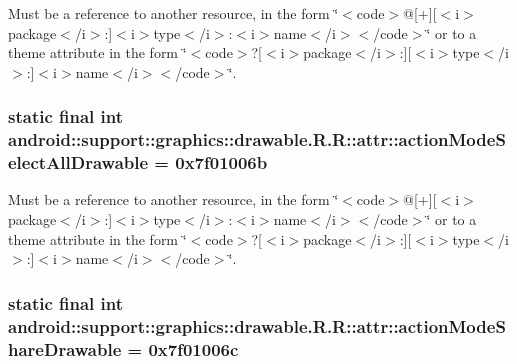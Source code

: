 Must be a reference to another resource, in the form \char`\"{}$<$code$>$@\mbox{[}+\mbox{]}\mbox{[}$<$i$>$package$<$/i$>$:\mbox{]}$<$i$>$type$<$/i$>$:$<$i$>$name$<$/i$>$$<$/code$>$\char`\"{} or to a theme attribute in the form \char`\"{}$<$code$>$?\mbox{[}$<$i$>$package$<$/i$>$:\mbox{]}\mbox{[}$<$i$>$type$<$/i$>$:\mbox{]}$<$i$>$name$<$/i$>$$<$/code$>$\char`\"{}. \hypertarget{classandroid_1_1support_1_1graphics_1_1drawable_1_1_r_1_1attr_dd174a3dc818113c34b5471f650763ff}{
\subsubsection[{actionModeSelectAllDrawable}]{\setlength{\rightskip}{0pt plus 5cm}static final int android::support::graphics::drawable.R.R::attr::actionModeSelectAllDrawable = 0x7f01006b}}
\label{classandroid_1_1support_1_1graphics_1_1drawable_1_1_r_1_1attr_dd174a3dc818113c34b5471f650763ff}


Must be a reference to another resource, in the form \char`\"{}$<$code$>$@\mbox{[}+\mbox{]}\mbox{[}$<$i$>$package$<$/i$>$:\mbox{]}$<$i$>$type$<$/i$>$:$<$i$>$name$<$/i$>$$<$/code$>$\char`\"{} or to a theme attribute in the form \char`\"{}$<$code$>$?\mbox{[}$<$i$>$package$<$/i$>$:\mbox{]}\mbox{[}$<$i$>$type$<$/i$>$:\mbox{]}$<$i$>$name$<$/i$>$$<$/code$>$\char`\"{}. \hypertarget{classandroid_1_1support_1_1graphics_1_1drawable_1_1_r_1_1attr_56f5e9ccfff3a69875d5425a78f07560}{
\subsubsection[{actionModeShareDrawable}]{\setlength{\rightskip}{0pt plus 5cm}static final int android::support::graphics::drawable.R.R::attr::actionModeShareDrawable = 0x7f01006c}}
\label{classandroid_1_1support_1_1graphics_1_1drawable_1_1_r_1_1attr_56f5e9ccfff3a69875d5425a78f07560}


